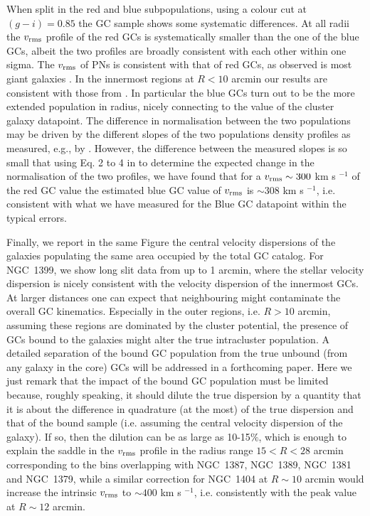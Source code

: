 \documentclass[useAMS,usenatbib]{mn2e}
\begin{document}
When split in the red and blue subpopulations, using a colour cut at $(g - i) = 0.85$ 
the GC sample shows some systematic differences. At all radii the $v_{\rm rms}$ 
profile of the red GCs is systematically smaller than the one of the blue GCs, 
albeit the two profiles are broadly consistent with each other within one sigma. 
The $v_{\rm rms}$ of PNs is consistent with that of red GCs, as observed is 
most giant galaxies \citep[e.g.,][]{Pota13}.
In the innermost regions at $R < 10$ arcmin our results are consistent with  
those from \citet{Schuberth}. In particular the blue GCs turn out to 
be the more extended population in radius, nicely connecting to the value of 
the cluster galaxy datapoint. The difference in normalisation between the two 
populations may be driven by the different slopes of the two 
populations density profiles as measured, e.g., by 
\citep[][their Eq. 10 and 11 and Table 5]{Schuberth}. However, the difference 
between the measured  slopes is so small that using Eq. 2 to 4 in \citet{Napolitano14} to 
determine the expected change in the normalisation of the two profiles, we have 
found that for a $v_{\rm rms} \sim 300$ km s $^{-1}$ of the red GC value the 
estimated blue GC value of $v_{\rm rms}$ is $\sim 308$ km s $^{-1}$, i.e. 
consistent with what we have measured for the Blue GC datapoint within the 
typical errors. 

Finally, we report in the same Figure the central velocity dispersions of 
the galaxies populating the same area occupied by the total GC catalog. 
For NGC~1399, we show long slit data from \citet{Saglia00} up 
to 1 arcmin, where the stellar velocity dispersion is nicely consistent with
the velocity dispersion of the innermost GCs.
At larger distances one can expect that neighbouring 
might contaminate the overall GC kinematics. Especially in the outer regions, 
i.e. $R>10$ arcmin, assuming these regions are dominated by the cluster 
potential, the presence of GCs bound to the galaxies might alter the true  
intracluster population. A detailed separation of the bound GC population from 
the true unbound (from any galaxy in the core) GCs will be addressed in a 
forthcoming paper. Here we just remark that the impact of the bound GC 
population must be limited because, roughly speaking, it should dilute the true 
dispersion by a quantity that it is about the difference in quadrature (at the 
most) of the true dispersion and that of the bound sample (i.e. assuming the 
central velocity dispersion of the galaxy). If so, then the dilution can be as 
large as 10-15$\%$, which is enough to explain the saddle in the  $v_{\rm rms}$ 
profile in the radius range $15<R<28$ arcmin corresponding to the bins 
overlapping with NGC~1387, NGC~1389, NGC~1381 and NGC~1379, while a similar 
correction for NGC~1404 at $R\sim10$ arcmin would increase the intrinsic $v_{\rm 
rms}$ to $\sim400$ km s $^{-1}$, i.e. consistently with the peak value at 
$R\sim 12$ arcmin.
\end{document}
